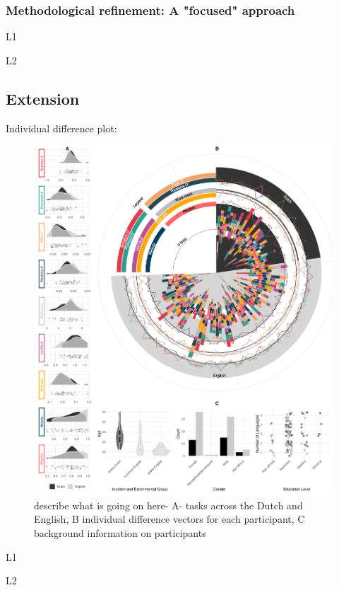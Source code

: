 \subsubsection{Methodological refinement: A "focused" approach}

L1 

L2

\subsection{Extension}

Individual difference plot:
\clearpage
\begin{figure}[p]  %
    \centering
    \includegraphics[width=\textwidth,height=\textheight,keepaspectratio]{viz/combined_plot_circle.png}
    \caption{describe what is going on here- A- tasks across the Dutch and English, B individual difference vectors for each participant, C background information on participants}
    \label{fig:combined_plot}
\end{figure}
\clearpage

L1 

L2


